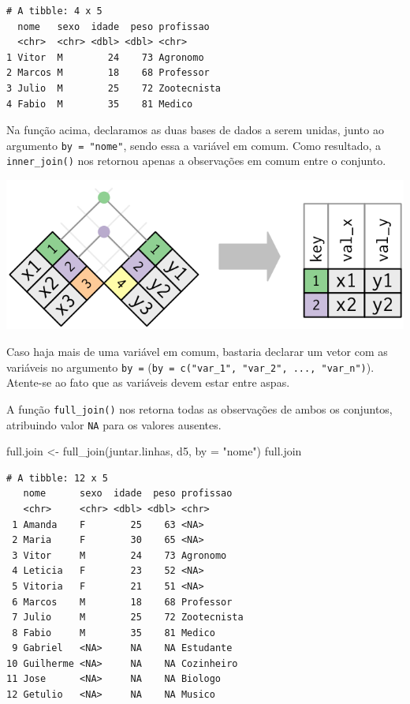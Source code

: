 \documentclass[
  brazilian,
]{book}
\newenvironment{Shaded}{\begin{snugshade}}{\end{snugshade}}
\newcommand{\AttributeTok}[1]{\textcolor[rgb]{0.77,0.63,0.00}{#1}}
\newcommand{\FunctionTok}[1]{\textcolor[rgb]{0.00,0.00,0.00}{#1}}
\newcommand{\NormalTok}[1]{#1}
\newcommand{\OtherTok}[1]{\textcolor[rgb]{0.56,0.35,0.01}{#1}}
\newcommand{\StringTok}[1]{\textcolor[rgb]{0.31,0.60,0.02}{#1}}
\let\origfigure\figure
\let\endorigfigure\endfigure
\renewenvironment{figure}[1][2] {
    \expandafter\origfigure\expandafter[H]
} {
    \endorigfigure
}
\begin{document}
\begin{verbatim}
# A tibble: 4 x 5
  nome   sexo  idade  peso profissao  
  <chr>  <chr> <dbl> <dbl> <chr>      
1 Vitor  M        24    73 Agronomo   
2 Marcos M        18    68 Professor  
3 Julio  M        25    72 Zootecnista
4 Fabio  M        35    81 Medico     
\end{verbatim}

Na função acima, declaramos as duas bases de dados a serem unidas, junto ao argumento \texttt{by\ =\ "nome"}, sendo essa a variável em comum. Como resultado, a \texttt{inner\_join()} nos retornou apenas a observações em comum entre o conjunto.

\begin{figure}

{\centering \includegraphics[width=0.5\linewidth]{imagens/join-inner} 

}

\caption{Esquematização da função inner-join. Fonte: R for Data Science, 2017.}\label{fig:unnamed-chunk-173}
\end{figure}

Caso haja mais de uma variável em comum, bastaria declarar um vetor com as variáveis no argumento \texttt{by\ =} (\texttt{by\ =\ c("var\_1",\ "var\_2",\ ...,\ "var\_n")}). Atente-se ao fato que as variáveis devem estar entre aspas.

A função \texttt{full\_join()} nos retorna todas as observações de ambos os conjuntos, atribuindo valor \texttt{NA} para os valores ausentes.

\begin{Shaded}
\begin{Highlighting}[]
\NormalTok{full.join }\OtherTok{\textless{}{-}} \FunctionTok{full\_join}\NormalTok{(juntar.linhas, d5, }\AttributeTok{by =} \StringTok{"nome"}\NormalTok{)}
\NormalTok{full.join}
\end{Highlighting}
\end{Shaded}

\begin{verbatim}
# A tibble: 12 x 5
   nome      sexo  idade  peso profissao  
   <chr>     <chr> <dbl> <dbl> <chr>      
 1 Amanda    F        25    63 <NA>       
 2 Maria     F        30    65 <NA>       
 3 Vitor     M        24    73 Agronomo   
 4 Leticia   F        23    52 <NA>       
 5 Vitoria   F        21    51 <NA>       
 6 Marcos    M        18    68 Professor  
 7 Julio     M        25    72 Zootecnista
 8 Fabio     M        35    81 Medico     
 9 Gabriel   <NA>     NA    NA Estudante  
10 Guilherme <NA>     NA    NA Cozinheiro 
11 Jose      <NA>     NA    NA Biologo    
12 Getulio   <NA>     NA    NA Musico     
\end{verbatim}
\end{document}
